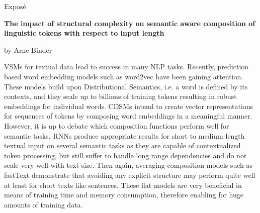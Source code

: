 
\begin{center}
	\huge{Expos\'e} 
	\vspace{0.5cm}
	 
	\large{\bf{The impact of structural complexity on semantic aware composition of linguistic tokens with respect to input length}} 
	\vspace{0.5cm}

	by Arne Binder \\
\end{center}

\vspace{0.5cm}
\normalsize

\acfp{VSM} for textual data lead to success in many \ac{NLP} tasks. Recently, prediction based word embedding models such as word2vec %
have been gaining attention. These models build upon Distributional Semantics, i.e. a word is defined by its contexts, and they scale up to billions of training tokens %
resulting in robust embeddings for individual words. 
\acfp{CDSM} intend to create vector representations for sequences of tokens by composing word embeddings in a meaningful manner. However, it is up to debate which composition functions perform well for semantic tasks. \acp{RNN} produce appropriate results for short to medium length textual input on several semantic tasks \autocite{vinyals_show_2014,wu_googles_2016,xiong_microsoft_2017} as they are capable of contextualized token processing, but still suffer to handle long range dependencies and do not scale very well with text size. Then again, averaging composition models such as fastText \autocite{joulin_bag_2017} demonstrate that avoiding any explicit structure may perform quite well at least for short texts like sentences. These flat models are very beneficial in means of training time and memory consumption, therefore enabling for huge amounts of training data. 

